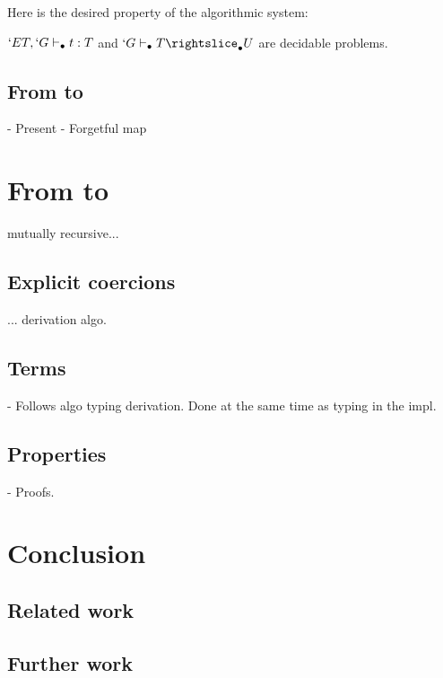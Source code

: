 \documentclass[twocolumn]{article}
\begin{document}
Here is the desired property of the algorithmic system:
\begin{theorem}
  $`E T, `G \vdash_{\bullet} t : T$ and $`G \typea T \suba U$ are decidable
  problems.
\end{theorem}

\subsection{From \CCq to \lng{}}
- Present \CCq
- Forgetful map

\section{From \lng{} to \CCq{}}
mutually recursive...

\subsection{Explicit coercions}
... derivation algo.

\subsection{Terms}
- Follows algo typing derivation. Done at the same time as typing in the
impl.

\subsection{Properties}
- Proofs.

\section{Conclusion}
\subsection{Related work}

\subsection{Further work}
\end{document}
